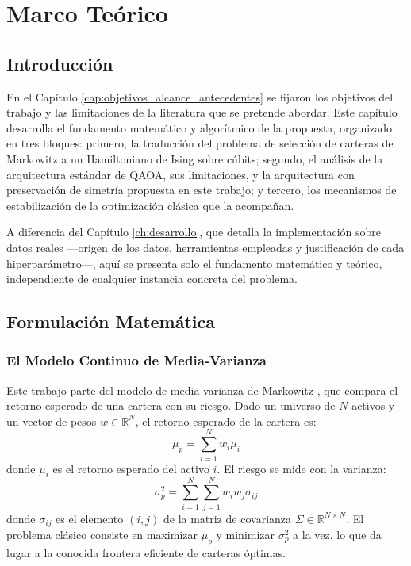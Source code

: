 \chapter{Marco Teórico}
\label{ch:marco_teorico}

\section{Introducción}
\label{sec:intro_marco_teorico}

En el Capítulo \ref{cap:objetivos_alcance_antecedentes} se fijaron los objetivos del trabajo y las limitaciones de la literatura que se pretende abordar. Este capítulo desarrolla el fundamento matemático y algorítmico de la propuesta, organizado en tres bloques: primero, la traducción del problema de selección de carteras de Markowitz a un Hamiltoniano de Ising sobre cúbits; segundo, el análisis de la arquitectura estándar de QAOA, sus limitaciones, y la arquitectura con preservación de simetría propuesta en este trabajo; y tercero, los mecanismos de estabilización de la optimización clásica que la acompañan.

A diferencia del Capítulo \ref{ch:desarrollo}, que detalla la implementación sobre datos reales —origen de los datos, herramientas empleadas y justificación de cada hiperparámetro—, aquí se presenta solo el fundamento matemático y teórico, independiente de cualquier instancia concreta del problema.

\section{Formulación Matemática}
\label{sec:formulacion_matematica}

\subsection{El Modelo Continuo de Media-Varianza}
\label{subsec:modelo_media_varianza}

Este trabajo parte del modelo de media-varianza de Markowitz \cite{Markowitz1952}, que compara el retorno esperado de una cartera con su riesgo. Dado un universo de $N$ activos y un vector de pesos $w \in \mathbb{R}^N$, el retorno esperado de la cartera es:
\begin{equation}
    \mu_p = \sum_{i=1}^{N} w_i \mu_i
    \label{eq:retorno_cartera}
\end{equation}
donde $\mu_i$ es el retorno esperado del activo $i$. El riesgo se mide con la varianza:
\begin{equation}
    \sigma_p^2 = \sum_{i=1}^{N} \sum_{j=1}^{N} w_i w_j \sigma_{ij}
    \label{eq:riesgo_cartera}
\end{equation}
donde $\sigma_{ij}$ es el elemento $(i,j)$ de la matriz de covarianza $\Sigma \in \mathbb{R}^{N \times N}$. El problema clásico consiste en maximizar $\mu_p$ y minimizar $\sigma_p^2$ a la vez, lo que da lugar a la conocida frontera eficiente de carteras óptimas.

